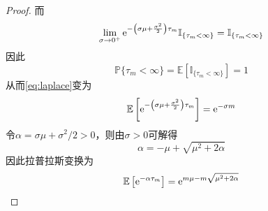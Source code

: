 \documentclass[cn]{homework}
\newcommand{\E}{\mathbb E}
\begin{document}
\begin{subproblem}
\begin{proof}
            而
            \[\lim_{\sigma\to0^+}
            \mathrm e^{-\left(\sigma\mu+\frac{\sigma^2}{2}\right)\tau_m}
            \mathbb I_{\{\tau_m<\infty\}}
            =\mathbb I_{\{\tau_m<\infty\}}\]
            因此
            \[\mathbb P\{\tau_m<\infty\}
            =\E\left[\mathbb I_{\{\tau_m<\infty\}}\right]=1\]
            从而\cref{eq:laplace}变为
            \[\E\left[\e^{-\left(\sigma\mu+\frac{\sigma^2}{2}\right)\tau_m}\right]
            =\e^{-\sigma m}\]
            令$\alpha=\sigma\mu+\sigma^2/2>0$，则由$\sigma>0$可解得
            \[\alpha=-\mu+\sqrt{\mu^2+2\alpha}\]
            因此拉普拉斯变换为
            \[\E\left[\e^{-\alpha\tau_m}\right]
            =\e^{m\mu-m\sqrt{\mu^2+2\alpha}}\]
            
        \end{proof}
    \end{subproblem}
\end{document}
